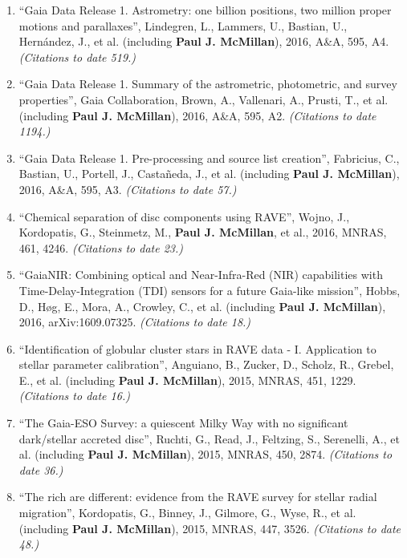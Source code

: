 \documentclass{resume}
\begin{document}
\begin{enumerate}
\item ``Gaia Data Release 1. Astrometry: one billion positions, two million proper motions and parallaxes'', Lindegren, L., Lammers, U., Bastian, U., Hern\'andez, J., et al. (including \textbf{Paul J. McMillan}), 2016, A\&A, 595, A4. \textit{(Citations to date 519.)}

\item ``Gaia Data Release 1. Summary of the astrometric, photometric, and survey properties'', Gaia Collaboration, Brown, A., Vallenari, A., Prusti, T., et al. (including \textbf{Paul J. McMillan}), 2016, A\&A, 595, A2. \textit{(Citations to date 1194.)}

\item ``Gaia Data Release 1. Pre-processing and source list creation'', Fabricius, C., Bastian, U., Portell, J., Casta\~neda, J., et al. (including \textbf{Paul J. McMillan}), 2016, A\&A, 595, A3. \textit{(Citations to date 57.)}

\item ``Chemical separation of disc components using RAVE'', Wojno, J., Kordopatis, G., Steinmetz, M., \textbf{Paul J. McMillan}, et al., 2016, MNRAS, 461, 4246. \textit{(Citations to date 23.)}

\item ``GaiaNIR: Combining optical and Near-Infra-Red (NIR) capabilities with Time-Delay-Integration (TDI) sensors for a future Gaia-like mission'', Hobbs, D., H{\o}g, E., Mora, A., Crowley, C., et al. (including \textbf{Paul J. McMillan}), 2016, arXiv:1609.07325. \textit{(Citations to date 18.)}

\item ``Identification of globular cluster stars in RAVE data - I. Application to stellar parameter calibration'', Anguiano, B., Zucker, D., Scholz, R., Grebel, E., et al. (including \textbf{Paul J. McMillan}), 2015, MNRAS, 451, 1229. \textit{(Citations to date 16.)}

\item ``The Gaia-ESO Survey: a quiescent Milky Way with no significant dark/stellar accreted disc'', Ruchti, G., Read, J., Feltzing, S., Serenelli, A., et al. (including \textbf{Paul J. McMillan}), 2015, MNRAS, 450, 2874. \textit{(Citations to date 36.)}

\item ``The rich are different: evidence from the RAVE survey for stellar radial migration'', Kordopatis, G., Binney, J., Gilmore, G., Wyse, R., et al. (including \textbf{Paul J. McMillan}), 2015, MNRAS, 447, 3526. \textit{(Citations to date 48.)}


\end{enumerate}
\end{document}
